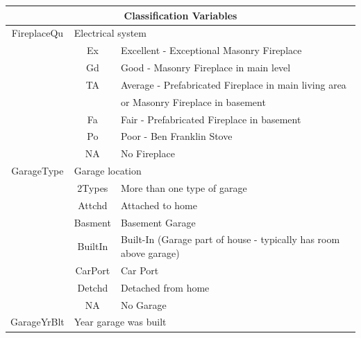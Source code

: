 \documentclass[11pt]{scrartcl} %
\begin{document}
\begin{center}
\begin{tabular}{c c c c c c}
\hline
\multicolumn{6}{|c|}{Classification Variables}\\
\hline
\multicolumn{2}{|c}{FireplaceQu} & \multicolumn{4}{l|}{Electrical system}\\ 
\multicolumn{2}{|c}{} & \multicolumn{1}{c}{Ex} & \multicolumn{3}{l|}{Excellent - Exceptional Masonry Fireplace}\\
\multicolumn{2}{|c}{} & \multicolumn{1}{c}{Gd} & \multicolumn{3}{l|}{Good - Masonry Fireplace in main level}\\
\multicolumn{2}{|c}{} & \multicolumn{1}{c}{TA} & \multicolumn{3}{l|}{Average - Prefabricated Fireplace in main living area }\\
\multicolumn{2}{|c}{} & \multicolumn{1}{c}{} & \multicolumn{3}{l|}{ or Masonry Fireplace in basement}\\
\multicolumn{2}{|c}{} & \multicolumn{1}{c}{Fa} & \multicolumn{3}{l|}{Fair - Prefabricated Fireplace in basement}\\
\multicolumn{2}{|c}{} & \multicolumn{1}{c}{Po} & \multicolumn{3}{l|}{Poor - Ben Franklin Stove}\\
\multicolumn{2}{|c}{} & \multicolumn{1}{c}{NA} & \multicolumn{3}{l|}{No Fireplace}\\
\hline
\multicolumn{2}{|c}{GarageType} & \multicolumn{4}{l|}{Garage location}\\ 
\multicolumn{2}{|c}{} & \multicolumn{1}{c}{2Types} & \multicolumn{3}{l|}{More than one type of garage}\\
\multicolumn{2}{|c}{} & \multicolumn{1}{c}{Attchd} & \multicolumn{3}{l|}{Attached to home}\\
\multicolumn{2}{|c}{} & \multicolumn{1}{c}{Basment} & \multicolumn{3}{l|}{Basement Garage}\\
\multicolumn{2}{|c}{} & \multicolumn{1}{c}{BuiltIn} & \multicolumn{3}{l|}{Built-In (Garage part of house - typically has room above garage)}\\
\multicolumn{2}{|c}{} & \multicolumn{1}{c}{CarPort} & \multicolumn{3}{l|}{Car Port}\\
\multicolumn{2}{|c}{} & \multicolumn{1}{c}{Detchd} & \multicolumn{3}{l|}{Detached from home}\\
\multicolumn{2}{|c}{} & \multicolumn{1}{c}{NA} & \multicolumn{3}{l|}{No Garage}\\
\hline
\multicolumn{2}{|c}{GarageYrBlt} & \multicolumn{4}{l|}{Year garage was built}\\

\end{tabular}
\end{center}
\end{document}
